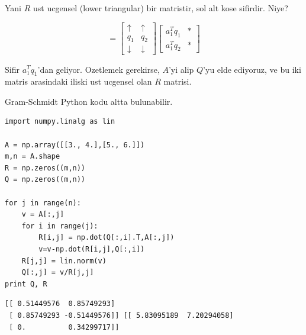 \documentclass[12pt,fleqn]{article}\usepackage{../common}
\begin{document}
Yani $R$ ust ucgensel (lower triangular) bir matristir, sol alt kose
sifirdir. Niye? 

\[ 
=
\left[\begin{array}{rrr}
\uparrow &  \uparrow \\
q_1 &  q_2 \\
\downarrow &  \downarrow 
\end{array}\right]
\left[\begin{array}{rrr}
a_1^Tq_1 &  * \\
a_1^Tq_2 &  *
\end{array}\right]
 \]

Sifir $a_1^Tq_1$'dan geliyor. Ozetlemek gerekirse, $A$'yi alip $Q$'yu elde
ediyoruz, ve bu iki matris arasindaki iliski ust ucgensel olan $R$
matrisi. 

Gram-Schmidt Python kodu altta bulunabilir.

\begin{verbatim}
import numpy.linalg as lin

A = np.array([[3., 4.],[5., 6.]])
m,n = A.shape
R = np.zeros((m,n))
Q = np.zeros((m,n))

for j in range(n):
    v = A[:,j]
    for i in range(j):
        R[i,j] = np.dot(Q[:,i].T,A[:,j])
        v=v-np.dot(R[i,j],Q[:,i])
    R[j,j] = lin.norm(v)
    Q[:,j] = v/R[j,j]
print Q, R
\end{verbatim}

\begin{verbatim}
[[ 0.51449576  0.85749293]
 [ 0.85749293 -0.51449576]] [[ 5.83095189  7.20294058]
 [ 0.          0.34299717]]
\end{verbatim}
\end{document}
